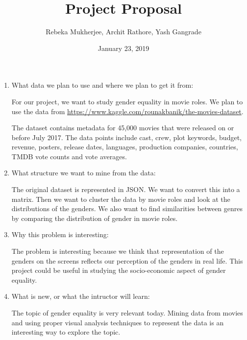\documentclass[11pt]{article}
\title{Project Proposal}
\author{Rebeka Mukherjee, Archit Rathore, Yash Gangrade}
\date{January 23, 2019}
\begin{document}
\maketitle

\begin{enumerate}

\item What data we plan to use and where we plan to get it from:

For our project, we want to study gender equality in movie roles. We plan to use the data from \url{https://www.kaggle.com/rounakbanik/the-movies-dataset}.

The dataset contains metadata for 45,000 movies that were released on or before July 2017. The data points include cast, crew, plot keywords, budget, revenue, posters, release dates, languages, production companies, countries, TMDB vote counts and vote averages.

\item What structure we want to mine from the data:

The original dataset is represented in JSON. We want to convert this into a matrix. Then we want to cluster the data by movie roles and look at the distributions of the genders. We also want to find similarities between genres by comparing the distribution of gender in movie roles.

\item Why this problem is interesting:

The problem is interesting because we think that representation of the genders on the screens reflects our perception of the genders in real life. This project could be useful in studying the socio-economic aspect of gender equality.

\item What is new, or what the intructor will learn:

The topic of gender equality is very relevant today. Mining data from movies and using proper visual analysis techniques to represent the data is an interesting way to explore the topic.

\end{enumerate}
\end{document}
